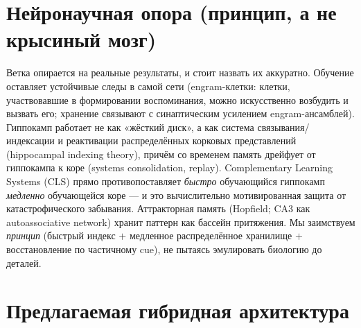 \section{Нейронаучная опора (принцип, а не крысиный мозг)}

Ветка опирается на реальные результаты, и стоит назвать их аккуратно. Обучение оставляет
устойчивые следы в самой сети (engram-клетки: клетки, участвовавшие в формировании
воспоминания, можно искусственно возбудить и вызвать его; хранение связывают с синаптическим
усилением engram-ансамблей). Гиппокамп работает не как «жёсткий диск», а как система
связывания/индексации и реактивации распределённых корковых представлений (hippocampal
indexing theory), причём со временем память дрейфует от гиппокампа к коре (systems
consolidation, replay). Complementary Learning Systems (CLS) прямо противопоставляет
\emph{быстро} обучающийся гиппокамп \emph{медленно} обучающейся коре — и это вычислительно
мотивированная защита от катастрофического забывания. Аттракторная память (Hopfield; CA3 как
autoassociative network) хранит паттерн как бассейн притяжения. Мы заимствуем \emph{принцип}
(быстрый индекс $+$ медленное распределённое хранилище $+$ восстановление по частичному cue),
не пытаясь эмулировать биологию до деталей.

\section{Предлагаемая гибридная архитектура}

